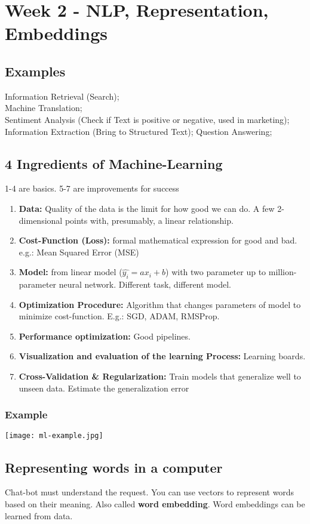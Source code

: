 \section{Week 2 - NLP, Representation, Embeddings}
\subsection{Examples}
Information Retrieval (Search);\\
Machine Translation;\\
Sentiment Analysis (Check if Text is positive or negative, used in marketing);\\
Information Extraction (Bring to Structured Text);
Question Answering;

\subsection{4 Ingredients of Machine-Learning}
1-4 are basics. 5-7 are improvements for success
\begin{enumerate}
    \item \textbf{Data:} Quality of the data is the limit for how good we can do. A few 2-dimensional points with, presumably, a linear relationship.
    \item \textbf{Cost-Function (Loss):} formal mathematical expression for good and bad. e.g.: Mean Squared Error (MSE)
    \item \textbf{Model:} from linear model ($\hat{y_i} = ax_i + b$) with two parameter up to million-parameter neural network. Different task, different model.
    \item \textbf{Optimization Procedure:} Algorithm that changes parameters of model to minimize cost-function. E.g.: SGD, ADAM, RMSProp.
    \item \textbf{Performance optimization:} Good pipelines.
    \item \textbf{Visualization and evaluation of the learning Process:} Learning boards.
    \item \textbf{Cross-Validation \& Regularization: } Train models that generalize well to unseen data. Estimate the generalization error
\end{enumerate}

\subsubsection{Example}
\texttt{[image: ml-example.jpg]}

\subsection{Representing words in a computer}
Chat-bot must understand the request.
You can use vectors to represent words based on their meaning.
Also called \textbf{word embedding}. Word embeddings can be learned from data.


